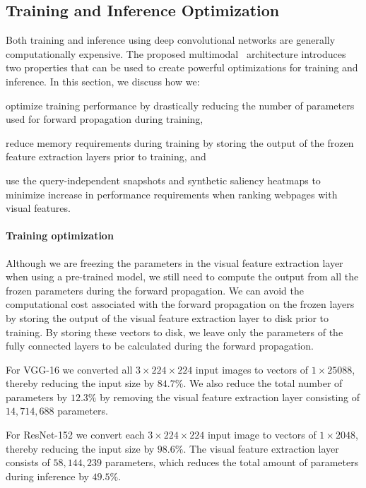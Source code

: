 \subsection{Training and Inference Optimization}
Both training and inference using deep convolutional networks are generally computationally expensive.
The proposed multimodal \modelname~architecture introduces two properties that can be used to create powerful optimizations for training and inference. In this section, we discuss how we: \begin{inparaenum}[(i)]
\item optimize training performance by drastically reducing the number of parameters used for forward propagation during training, 
\item reduce memory requirements during training by storing the output of the frozen feature extraction layers prior to training, and
\item use the query-independent snapshots and synthetic saliency heatmaps to minimize increase in performance requirements when ranking webpages with visual features.
\end{inparaenum}

\paragraph{Training optimization}
Although we are freezing the parameters in the visual feature extraction layer when using a pre-trained model, we still need to compute the output from all the frozen parameters during the forward propagation. We can avoid the computational cost associated with the forward propagation on the frozen layers by storing the output of the visual feature extraction layer to disk prior to training. By storing these vectors to disk, we leave only the parameters of the fully connected layers to be calculated during the forward propagation. 

For VGG-16 we converted all $3\times224\times224$ input images to vectors of $1\times25088$, thereby reducing the input size by $84.7\%$. We also reduce the total number of parameters by $12.3\%$ by removing the visual feature extraction layer consisting of $14,714,688$ parameters.

For ResNet-152 we convert each $3\times224\times224$ input image to vectors of $1\times2048$, thereby reducing the input size by $98.6\%$. The visual feature extraction layer consists of $58,144,239$ parameters, which reduces the total amount of parameters during inference by $49.5\%$.

